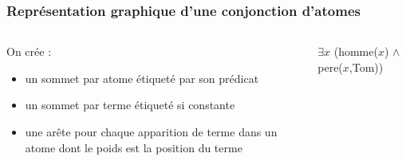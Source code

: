 \begin{frame}
	\frametitle{Représentation graphique d'une conjonction d'atomes}

	\begin{columns}
	
	\begin{column}{0.45\linewidth}
		On crée :
		\begin{itemize}
			\item un sommet par atome étiqueté par son prédicat \checkmark
			\item un sommet par terme étiqueté si constante \checkmark
			\item une arête pour chaque apparition de terme dans un atome 
			dont le poids est la position du terme 
		\end{itemize}
	\end{column}
	\vline
	\hfill
	\begin{column}{0.45\linewidth}
		$\exists x$ (homme($x$) $\wedge$ pere($x$,Tom))
		\begin{figure}
		\end{figure}
	\end{column}
	\end{columns}
\end{frame}

